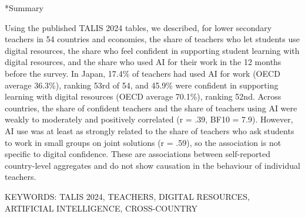 \documentclass[a4paper,10pt,twocolumn]{ltjsarticle}
\makeatletter
\renewcommand{\section}{\@startsection{section}{1}{\z@}{1.1\Cvs \@plus.4\Cdp \@minus.2\Cdp}{.5\Cvs \@plus.2\Cdp}{\normalfont\gtfamily\bfseries\large}}
\makeatother
\begin{document}
\section*{Summary}
{\footnotesize\setlength{\parindent}{0pt}Using the published TALIS 2024 tables, we described, for lower secondary teachers in 54 countries and economies, the share of teachers who let students use digital resources, the share who feel confident in supporting student learning with digital resources, and the share who used AI for their work in the 12 months before the survey. In Japan, 17.4\% of teachers had used AI for work (OECD average 36.3\%), ranking 53rd of 54, and 45.9\% were confident in supporting learning with digital resources (OECD average 70.1\%), ranking 52nd. Across countries, the share of confident teachers and the share of teachers using AI were weakly to moderately and positively correlated (r = .39, BF10 = 7.9). However, AI use was at least as strongly related to the share of teachers who ask students to work in small groups on joint solutions (r = .59), so the association is not specific to digital confidence. These are associations between self-reported country-level aggregates and do not show causation in the behaviour of individual teachers.\par\smallskip KEYWORDS: TALIS 2024, TEACHERS, DIGITAL RESOURCES, ARTIFICIAL INTELLIGENCE, CROSS-COUNTRY\par}
\medskip\noindent{}
\end{document}
